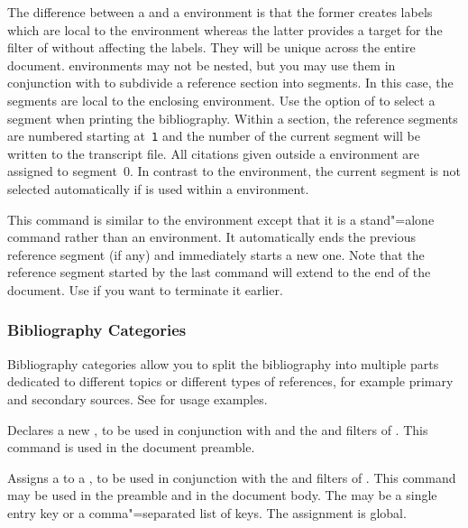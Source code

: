 \documentclass{ltxdockit}[2011/03/25]
\begin{document}
\begin{ltxsyntax}


The difference between a  and a  environment is that the former creates labels which are local to the environment whereas the latter provides a target for the  filter of  without affecting the labels. They will be unique across the entire document.  environments may not be nested, but you may use them in conjunction with  to subdivide a reference section into segments. In this case, the segments are local to the enclosing  environment. Use the  option of  to select a segment when printing the bibliography. Within a section, the reference segments are numbered starting at~\texttt{1} and the number of the current segment will be written to the transcript file. All citations given outside a  environment are assigned to segment~0. In contrast to the  environment, the current segment is not selected automatically if  is used within a  environment.


This command is similar to the  environment except that it is a stand"=alone command rather than an environment. It automatically ends the previous reference segment (if any) and immediately starts a new one. Note that the reference segment started by the last  command will extend to the end of the document. Use  if you want to terminate it earlier.

\end{ltxsyntax}

\subsubsection{Bibliography Categories}
\label{use:bib:cat}

Bibliography categories allow you to split the bibliography into multiple parts dedicated to different topics or different types of references, for example primary and secondary sources. See  for usage examples.

\begin{ltxsyntax}


Declares a new , to be used in conjunction with  and the 
 and  filters of . This command is used in the document preamble.


Assigns a  to a , to be used in conjunction with the  and  filters of . This command may be used in the preamble and in the document body. The  may be a single entry key or a comma"=separated list of keys. The assignment is global.

\end{ltxsyntax}
\end{document}
